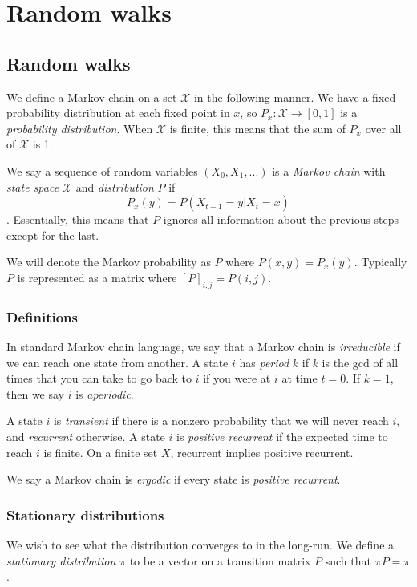 \documentclass[]{article}
\theoremstyle{definition}
\numberwithin{theorem}{section}
\numberwithin{equation}{section}
\begin{document}
\section{Random walks}\label{sec:random walks}

\subsection{Random walks}
We define a Markov chain on a set $\mathcal{X}$ in the following manner. We have a fixed probability distribution at each fixed point in $x$, so $P_x : \mathcal{X} \rightarrow [0, 1]$ is a \textit{probability distribution}. When $\mathcal{X}$ is finite, this means that the sum of $P_x$ over all of $\mathcal{X}$ is 1. 

We say a sequence of random variables $(X_0, X_1, ...)$ is a \textit{Markov chain} with\textit{ state space} $\mathcal{X}$ and \textit{distribution} $P$ if 
\begin{equation}
	P_x(y) = P(X_{t + 1} = y | X_t = x)
\end{equation}.
Essentially, this means that $P$ ignores all information about the previous steps except for the last. 

We will denote the Markov probability as $P$ where $P(x, y) = P_x(y)$. Typically $P$ is represented as a matrix where $[P]_{i,j} = P(i, j)$. 

\subsubsection{Definitions}
In standard Markov chain language, we say that a Markov chain is \textit{irreducible} if we can reach one state from another. A state $i$ has \textit{period} $k$ if $k$ is the gcd of all times that you can take to go back to $i$ if you were at $i$ at time $t = 0$. If $k = 1$, then we say $i$ is \textit{aperiodic}. 

A state $i$ is \textit{transient} if there is a nonzero probability that we will never reach $i$, and \textit{recurrent} otherwise. A state $i$ is \textit{positive recurrent} if the expected time to reach $i$ is finite. On a finite set $X$, recurrent implies positive recurrent. 

We say a Markov chain is \textit{ergodic} if every state is \textit{positive recurrent}. 
\subsubsection{Stationary distributions}
We wish to see what the distribution converges to in the long-run. We define a\textit{ stationary distribution} $\pi$ to be a vector on a transition matrix $P$ such that $\pi P = \pi$. 
\end{document}
